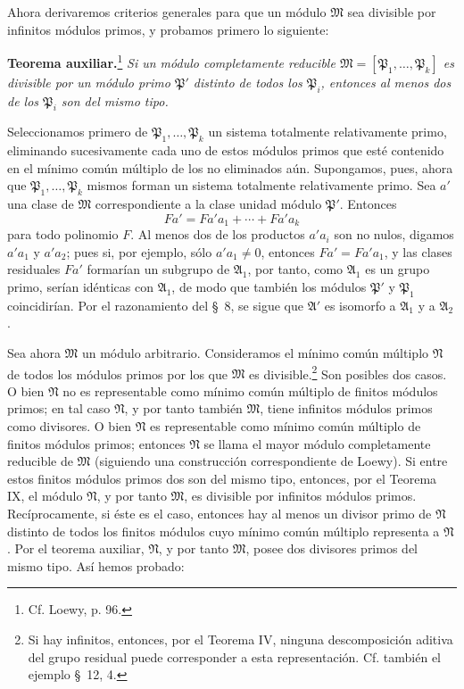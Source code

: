 Ahora derivaremos criterios generales para que un módulo $\mathfrak M$ sea divisible por infinitos módulos primos, y probamos primero lo siguiente:

\textbf{Teorema auxiliar.}\footnote{Cf. Loewy, p. 96.} \emph{Si un módulo completamente reducible $\mathfrak M=[\mathfrak P_1,\ldots,\mathfrak P_k]$ es divisible por un módulo primo $\mathfrak P'$ distinto de todos los $\mathfrak P_i$, entonces al menos dos de los $\mathfrak P_i$ son del mismo tipo.}

Seleccionamos primero de $\mathfrak P_1,\ldots,\mathfrak P_k$ un sistema totalmente relativamente primo, eliminando sucesivamente cada uno de estos módulos primos que esté contenido en el mínimo común múltiplo de los no eliminados aún. Supongamos, pues, ahora que $\mathfrak P_1,\ldots,\mathfrak P_k$ mismos forman un sistema totalmente relativamente primo. Sea $a'$ una clase de $\mathfrak M$ correspondiente a la clase unidad módulo $\mathfrak P'$. Entonces
\[
 Fa'=Fa'a_1+
\cdots+Fa'a_k
\]
para todo polinomio $F$. Al menos dos de los productos $a'a_i$ son no nulos, digamos $a'a_1$ y $a'a_2$; pues si, por ejemplo, sólo $a'a_1\ne0$, entonces $Fa'=Fa'a_1$, y las clases residuales $Fa'$ formarían un subgrupo de $\mathfrak A_1$, por tanto, como $\mathfrak A_1$ es un grupo primo, serían idénticas con $\mathfrak A_1$, de modo que también los módulos $\mathfrak P'$ y $\mathfrak P_1$ coincidirían. Por el razonamiento del \S~8, se sigue que $\mathfrak A'$ es isomorfo a $\mathfrak A_1$ y a $\mathfrak A_2$.

Sea ahora $\mathfrak M$ un módulo arbitrario. Consideramos el mínimo común múltiplo $\mathfrak N$ de todos los módulos primos por los que $\mathfrak M$ es divisible.\footnote{Si hay infinitos, entonces, por el Teorema IV, ninguna descomposición aditiva del grupo residual puede corresponder a esta representación. Cf. también el ejemplo \S~12, 4.} Son posibles dos casos. O bien $\mathfrak N$ no es representable como mínimo común múltiplo de finitos módulos primos; en tal caso $\mathfrak N$, y por tanto también $\mathfrak M$, tiene infinitos módulos primos como divisores. O bien $\mathfrak N$ es representable como mínimo común múltiplo de finitos módulos primos; entonces $\mathfrak N$ se llama el mayor módulo completamente reducible de $\mathfrak M$ (siguiendo una construcción correspondiente de Loewy). Si entre estos finitos módulos primos dos son del mismo tipo, entonces, por el Teorema IX, el módulo $\mathfrak N$, y por tanto $\mathfrak M$, es divisible por infinitos módulos primos. Recíprocamente, si éste es el caso, entonces hay al menos un divisor primo de $\mathfrak N$ distinto de todos los finitos módulos cuyo mínimo común múltiplo representa a $\mathfrak N$. Por el teorema auxiliar, $\mathfrak N$, y por tanto $\mathfrak M$, posee dos divisores primos del mismo tipo. Así hemos probado:

